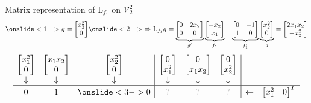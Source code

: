 \documentclass[10pt,T]{beamer}
\newcommand{\transparent}[1]{\textcolor{lightgray}{#1}}
\begin{document}
\begin{frame}[b]{Matrix representation of L$_{f_1}$ on $\mathcal{V}_2^2$}
\begin{equation*}
  \onslide<1->{g=\begin{bmatrix}x_2^2\\0\end{bmatrix}}
  \onslide<2->{\Rightarrow\text{L}_{f_1}g=\underbrace{\begin{bmatrix}0&2x_2\\0&0\end{bmatrix}}_{g'}\underbrace{\begin{bmatrix}-x_2\\x_1\end{bmatrix}}_{f_1}
    -\underbrace{\begin{bmatrix}0&-1\\1&0\end{bmatrix}}_{f_1'}\underbrace{\begin{bmatrix}x_2^2\\0\end{bmatrix}}_{g}=\begin{bmatrix}2x_1x_2\\-x_2^2\end{bmatrix}}
\end{equation*}
\begin{equation*}
  \begin{array}{ccc|ccc|cc}
    \begin{bmatrix}x_1^2\\0\end{bmatrix}&\begin{bmatrix}x_1x_2\\0\end{bmatrix}&\begin{bmatrix}x_2^2\\0\end{bmatrix}&\begin{bmatrix}0\\x_1^2\end{bmatrix}&\begin{bmatrix}0\\x_1x_2\end{bmatrix}&\begin{bmatrix}0\\x_2^2\end{bmatrix}&&\\
    \downarrow&\downarrow&\downarrow&\downarrow&\downarrow&\downarrow&&\\\hline
    0&1&\onslide<3->{0}&\transparent{?}&\transparent{?}&\transparent{?}&\leftarrow&\begin{bmatrix}x_1^2&0\end{bmatrix}^T\\

\end{array}
\end{equation*}
\end{frame}
\end{document}
